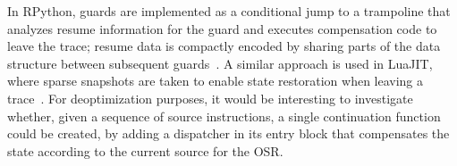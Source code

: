 In RPython, guards are implemented as a conditional jump to a trampoline that analyzes resume information for the guard and executes compensation code to leave the trace; resume data is compactly encoded by sharing parts of the data structure between subsequent guards~\cite{Schneider12}. A similar approach is used in LuaJIT, where sparse snapshots are taken to enable state restoration when leaving a trace~\cite{luajit}. For deoptimization purposes, it would be interesting to investigate whether, given a sequence of source instructions, a single continuation function could be created, by adding a dispatcher in its entry block that compensates the state according to the current source for the OSR.